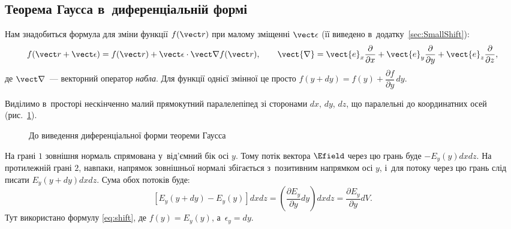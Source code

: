 \subsection*{Теорема Гаусса в~диференціальній формі}



Нам знадобиться формула для зміни функції $f(\vect r)$ при малому зміщенні
$\vect\epsilon$ (її виведено в~додатку~\ref{sec:SmallShift}):
\begin{equation}\label{eq:shift}
	f(\vect r + \vect\epsilon) = f(\vect r) + \vect\epsilon\cdot\vect\nabla f(\vect r),
	\qquad
	\vect{\nabla} = \vect{e}_x \frac{\partial}{\partial x} +
	\vect{e}_y \frac{\partial}{\partial y} + \vect{e}_z \frac{\partial}{\partial z},
\end{equation}
де $\vect\nabla$~--- векторний оператор \emph{набла}. Для функції однієї змінної це просто
$f(y+dy) = f(y) + \dfrac{\partial f}{\partial y}\,dy$.

Виділимо в~просторі нескінченно малий прямокутний паралелепіпед зі сторонами $dx$, $dy$,
$dz$, що паралельні до координатних осей (рис.~\ref{tikz:div}).

\begin{figure}
	\centering


	\caption{До виведення диференціальної форми теореми Гаусса}
	\label{tikz:div}
\end{figure}

На грані $1$ зовнішня нормаль спрямована у~від'ємний бік осі $y$. Тому потік вектора
$\Efield$ через цю грань буде $-E_y(y) dx dz$. На протилежній грані $2$, навпаки, напрямок
зовнішньої нормалі збігається з~позитивним напрямком осі $y$, і~для потоку через цю грань
слід писати $E_y(y + dy) dx dz$. Сума обох потоків буде:
\begin{equation*}
	\left[E_y(y + dy) - E_y(y) \right] dxdz = \left( \frac{\partial
		E_y}{\partial y} dy\right) dxdz = \frac{\partial
		E_y}{\partial y} dV.
\end{equation*}
Тут використано формулу \eqref{eq:shift}, де $f(y) = E_y(y)$, а~$\epsilon_y = dy$.

